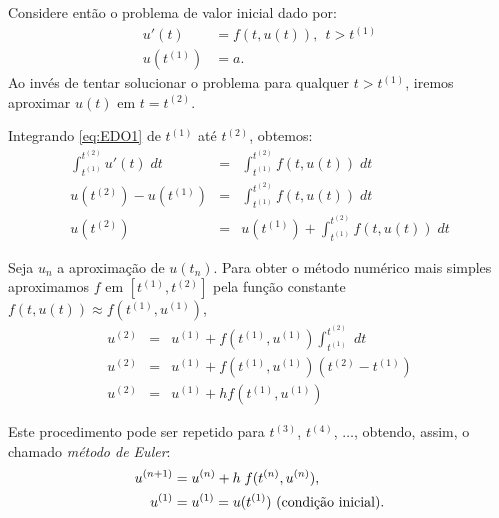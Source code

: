 Considere então o problema de valor inicial dado por:
\begin{equation}\label{eq:EDO1}
  \begin{split}
    u'(t)  &= f(t,u(t)),~~t>t^{(1)} \\
    u(t^{(1)}) &= a.
  \end{split}
\end{equation}
Ao invés de tentar solucionar o problema para qualquer $t>t^{(1)}$, iremos aproximar $u(t)$ em $t=t^{(2)}$.

Integrando \eqref{eq:EDO1} de $t^{(1)}$ até $t^{(2)}$, obtemos:
\begin{eqnarray}
  \int_{t^{(1)}}^{t^{(2)}} u'(t) \;dt &=& \int_{t^{(1)}}^{t^{(2)}} f(t,u(t)) \; dt\\
  u(t^{(2)})-u(t^{(1)})               &=& \int_{t^{(1)}}^{t^{(2)}} f(t,u(t)) \; dt\\
  u(t^{(2)})                      &=& u(t^{(1)}) +  \int _{t^{(1)}}^{t^{(2)}} f(t,u(t)) \; dt
\end{eqnarray}

Seja $u_n$ a aproximação de $u(t_n)$. Para obter o método numérico mais simples aproximamos $f$ em $[t^{(1)},t^{(2)}]$ pela função constante $f(t,u(t)) \approx  f(t^{(1)},u^{(1)})$,
\begin{eqnarray}
  u^{(2)} &=&  u^{(1)} +   f(t^{(1)},u^{(1)}) \int _{t^{(1)}}^{t^{(2)}}  \; dt \\
  u^{(2)} &=&  u^{(1)} +   f(t^{(1)},u^{(1)}) (t^{(2)}-t^{(1)}) \\
  u^{(2)} &=&  u^{(1)} + h f(t^{(1)},u^{(1)})
\end{eqnarray}

Este procedimento pode ser repetido para  $t^{(3)}$, $t^{(4)}$, $\ldots$, obtendo, assim, o chamado \emph{método de Euler}:
\begin{equation}\label{eq:euler}
  \begin{split}
    u^{(n+1)}&= u^{(n)} + h\;f(t^{(n)},u^{(n)}),\\
    u^{(1)}&= u^{(1)}=u(t^{(1)})~ \hbox{(condição inicial)}.
  \end{split}
\end{equation}


